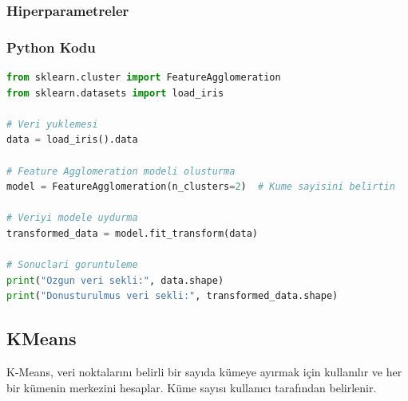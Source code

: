 \subsubsection{Hiperparametreler}

\begin{table}[h]
\centering
{\scriptsize\renewcommand{\arraystretch}{0.4}
{}}
\end{table}

\subsubsection{Python Kodu}

\begin{lstlisting}[language=Python, caption=Scikit-learn'de FeatureAgglomeration örneği.]
from sklearn.cluster import FeatureAgglomeration
from sklearn.datasets import load_iris

# Veri yuklemesi
data = load_iris().data

# Feature Agglomeration modeli olusturma
model = FeatureAgglomeration(n_clusters=2)  # Kume sayisini belirtin

# Veriyi modele uydurma
transformed_data = model.fit_transform(data)

# Sonuclari goruntuleme
print("Ozgun veri sekli:", data.shape)
print("Donusturulmus veri sekli:", transformed_data.shape)
\end{lstlisting}

\newpage

\subsection{KMeans}
K-Means, veri noktalarını belirli bir sayıda kümeye ayırmak için kullanılır ve her bir kümenin merkezini hesaplar. Küme sayısı kullanıcı tarafından belirlenir.

